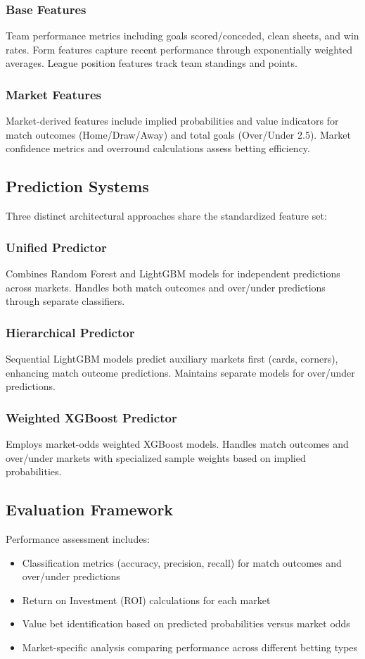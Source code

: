 \documentclass[conference]{IEEEtran}
\begin{document}
\subsubsection{Base Features}
Team performance metrics including goals scored/conceded, clean sheets, and win rates. Form features capture recent performance through exponentially weighted averages. League position features track team standings and points.

\subsubsection{Market Features}
Market-derived features include implied probabilities and value indicators for match outcomes (Home/Draw/Away) and total goals (Over/Under 2.5). Market confidence metrics and overround calculations assess betting efficiency.

\subsection{Prediction Systems}
Three distinct architectural approaches share the standardized feature set:

\subsubsection{Unified Predictor}
Combines Random Forest and LightGBM models for independent predictions across markets. Handles both match outcomes and over/under predictions through separate classifiers.

\subsubsection{Hierarchical Predictor}
Sequential LightGBM models predict auxiliary markets first (cards, corners), enhancing match outcome predictions. Maintains separate models for over/under predictions.

\subsubsection{Weighted XGBoost Predictor}
Employs market-odds weighted XGBoost models. Handles match outcomes and over/under markets with specialized sample weights based on implied probabilities.

\subsection{Evaluation Framework}
Performance assessment includes:
\begin{itemize}
    \item Classification metrics (accuracy, precision, recall) for match outcomes and over/under predictions
    \item Return on Investment (ROI) calculations for each market
    \item Value bet identification based on predicted probabilities versus market odds
    \item Market-specific analysis comparing performance across different betting types
\end{itemize}
\end{document}
